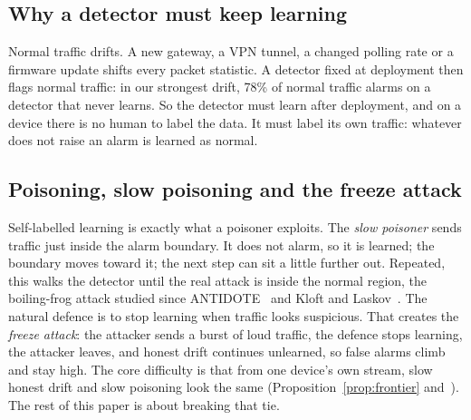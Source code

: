 \subsection{Why a detector must keep learning}
Normal traffic drifts. A new gateway, a VPN tunnel, a changed polling rate or a firmware update shifts
every packet statistic. A detector fixed at deployment then flags normal traffic: in our strongest
drift, 78\% of normal traffic alarms on a detector that never learns. So the detector must learn
after deployment, and on a device there is no human to label the data. It must label its own traffic:
whatever does not raise an alarm is learned as normal.

\subsection{Poisoning, slow poisoning and the freeze attack}
Self-labelled learning is exactly what a poisoner exploits. The \emph{slow poisoner} sends traffic just
inside the alarm boundary. It does not alarm, so it is learned; the boundary moves toward it; the next
step can sit a little further out. Repeated, this walks the detector until the real attack is inside
the normal region, the boiling-frog attack studied since ANTIDOTE~\cite{antidote} and Kloft and
Laskov~\cite{kloft}. The natural defence is to stop learning when traffic looks suspicious. That creates
the \emph{freeze attack}: the attacker sends a burst of loud traffic, the defence stops learning, the
attacker leaves, and honest drift continues unlearned, so false alarms climb and stay high. The core
difficulty is that from one device's own stream, slow honest drift and slow poisoning look the same
(Proposition~\ref{prop:frontier} and~\cite{warden}). The rest of this paper is about breaking that tie.
